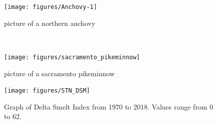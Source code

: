 \documentclass[
]{book}
\begin{document}
\begin{panel-grid}
\begin{columns-nocenter}
\begin{column800}
\begin{figure}

{\centering \texttt{[image: figures/Anchovy-1]} 

}

\caption{picture of a northern anchovy}\label{fig:unnamed-chunk-77}
\end{figure}

\end{column800}

\begin{column40}

~

\end{column40}

\begin{column800}

\begin{figure}

{\centering \texttt{[image: figures/sacramento\_pikeminnow]} 

}

\caption{picture of a sacramento pikeminnow}\label{fig:unnamed-chunk-78}
\end{figure}

\end{column800}

\end{columns-nocenter}

\begin{columns-nocenter}

\begin{column800}

\begin{expand}

\begin{figure}
\texttt{[image: figures/STN\_DSM]} \caption{Graph of Delta Smelt Index from 1970 to 2018. Values range from 0 to 62.}\label{fig:unnamed-chunk-79}
\end{figure}

\end{expand}

\end{column800}

\begin{column40}

~

\end{column40}

\begin{column800}

\begin{expand}


\end{expand}
\end{column800}
\end{columns-nocenter}
\end{panel-grid}
\end{document}
